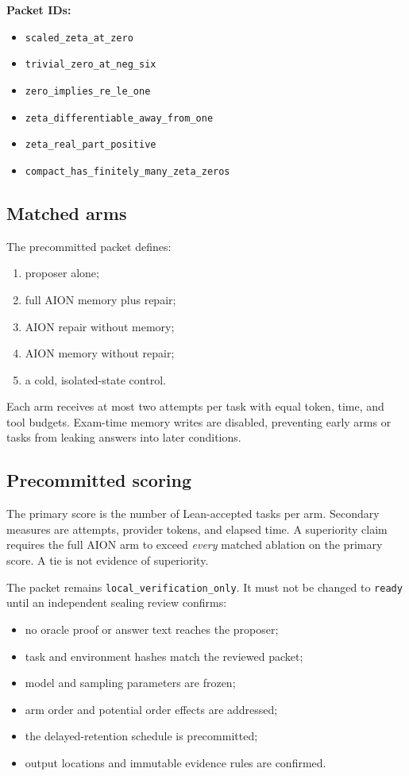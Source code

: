 \documentclass[11pt,a4paper]{article}
\newcommand{\code}[1]{\texttt{#1}}
\begin{document}
\textbf{Packet IDs:}
\begin{itemize}[leftmargin=11mm,itemsep=0pt,topsep=2pt]
  \item[T1] \code{scaled\_zeta\_at\_zero}
  \item[T2] \code{trivial\_zero\_at\_neg\_six}
  \item[T3] \code{zero\_implies\_re\_le\_one}
  \item[T4] \code{zeta\_differentiable\_away\_from\_one}
  \item[T5] \code{zeta\_real\_part\_positive}
  \item[T6] \code{compact\_has\_finitely\_many\_zeta\_zeros}
\end{itemize}

\subsection{Matched arms}

The precommitted packet defines:

\begin{enumerate}
  \item proposer alone;
  \item full AION memory plus repair;
  \item AION repair without memory;
  \item AION memory without repair;
  \item a cold, isolated-state control.
\end{enumerate}

Each arm receives at most two attempts per task with equal token, time, and tool
budgets. Exam-time memory writes are disabled, preventing early arms or tasks
from leaking answers into later conditions.

\subsection{Precommitted scoring}

The primary score is the number of Lean-accepted tasks per arm. Secondary
measures are attempts, provider tokens, and elapsed time. A superiority claim
requires the full AION arm to exceed \emph{every} matched ablation on the
primary score. A tie is not evidence of superiority.

The packet remains \code{local\_verification\_only}. It must not be changed to
\code{ready} until an independent sealing review confirms:

\begin{itemize}
  \item no oracle proof or answer text reaches the proposer;
  \item task and environment hashes match the reviewed packet;
  \item model and sampling parameters are frozen;
  \item arm order and potential order effects are addressed;
  \item the delayed-retention schedule is precommitted;
  \item output locations and immutable evidence rules are confirmed.
\end{itemize}
\end{document}
